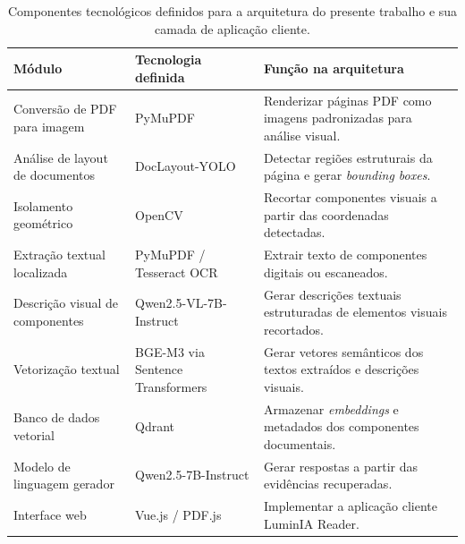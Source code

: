 \begin{table}[H]
\centering
\caption{Componentes tecnológicos definidos para a arquitetura do presente trabalho e sua camada de aplicação cliente.}
\label{tab:componentes-tecnologicos}

\renewcommand{\arraystretch}{1.35}
\begin{tabularx}{\textwidth}{|p{3.5cm}|p{4.0cm}|X|}
\hline
\textbf{Módulo} & \textbf{Tecnologia definida} & \textbf{Função na arquitetura} \\
\hline

Conversão de PDF para imagem 
& PyMuPDF 
& Renderizar páginas PDF como imagens padronizadas para análise visual. \\
\hline

Análise de layout de documentos 
& DocLayout-YOLO 
& Detectar regiões estruturais da página e gerar \textit{bounding boxes}. \\
\hline

Isolamento geométrico 
& OpenCV 
& Recortar componentes visuais a partir das coordenadas detectadas. \\
\hline

Extração textual localizada 
& PyMuPDF / Tesseract OCR 
& Extrair texto de componentes digitais ou escaneados. \\
\hline

Descrição visual de componentes
& Qwen2.5-VL-7B-Instruct
& Gerar descrições textuais estruturadas de elementos visuais recortados. \\
\hline

Vetorização textual 
& BGE-M3 via Sentence Transformers 
& Gerar vetores semânticos dos textos extraídos e descrições visuais. \\
\hline

Banco de dados vetorial 
& Qdrant 
& Armazenar \textit{embeddings} e metadados dos componentes documentais. \\
\hline

Modelo de linguagem gerador 
& Qwen2.5-7B-Instruct 
& Gerar respostas a partir das evidências recuperadas. \\
\hline

Interface web 
& Vue.js / PDF.js 
& Implementar a aplicação cliente LuminIA Reader. \\
\hline

\end{tabularx}

\end{table}

